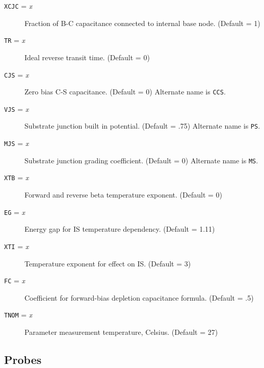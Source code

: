 \begin{description}
\item[{\tt XCJC} = {\it x}]
Fraction of B-C capacitance connected to internal base node.  (Default = 1)

\item[{\tt TR} = {\it x}]
Ideal reverse transit time.  (Default = 0)

\item[{\tt CJS} = {\it x}]
Zero bias C-S capacitance.  (Default = 0)  Alternate name is {\tt CCS}.

\item[{\tt VJS} = {\it x}]
Substrate junction built in potential.  (Default = .75)  Alternate name
is {\tt PS}.

\item[{\tt MJS} = {\it x}]
Substrate junction grading coefficient.  (Default = 0) Alternate name
is {\tt MS}.

\item[{\tt XTB} = {\it x}]
Forward and reverse beta temperature exponent.  (Default = 0)

\item[{\tt EG} = {\it x}]
Energy gap for IS temperature dependency.  (Default = 1.11)

\item[{\tt XTI} = {\it x}]
Temperature exponent for effect on IS.  (Default = 3)

\item[{\tt FC} = {\it x}]
Coefficient for forward-bias depletion capacitance formula.  (Default = .5)

\item[{\tt TNOM} = {\it x}]
Parameter measurement temperature, Celsius.  (Default = 27)

\end{description}
\subsection{Probes}

